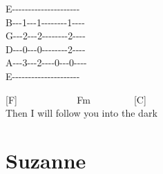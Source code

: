 \documentclass[
  letterpaper,
]{scrbook}
\begin{document}
E-\/-\/-\/-\/-\/-\/-\/-\/-\/-\/-\/-\/-\/-\/-\/-\/-\/-\/-\/-\/-\textbar{}\\
B-\/-\/-1-\/-\/-1-\/-\/-\/-\/-\/-\/-\/-1-\/-\/-\/-\textbar{}\\
G-\/-\/-2-\/-\/-2-\/-\/-\/-\/-\/-\/-\/-2-\/-\/-\/-\textbar{}\\
D-\/-\/-0-\/-\/-0-\/-\/-\/-\/-\/-\/-\/-2-\/-\/-\/-\textbar{}\\
A-\/-\/-3-\/-\/-2-\/-\/-\/-0-\/-\/-0-\/-\/-\/-\textbar{}\\
E-\/-\/-\/-\/-\/-\/-\/-\/-\/-\/-\/-\/-\/-\/-\/-\/-\/-\/-\/-\/-\textbar{}

{[}F{]} ~ ~ ~ ~ ~ ~ ~ Fm ~ ~ ~ ~ ~ {[}C{]} ~\\
Then I will follow you into the dark

\hypertarget{suzanne}{%
\chapter{Suzanne}\label{suzanne}}
\end{document}
